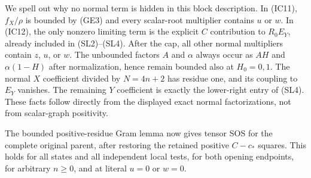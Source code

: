We spell out why no normal term is hidden in this block description.
In (IC11), $f_X/\rho$ is bounded by (GE3) and every scalar-root
multiplier contains $u$ or $w$. In (IC12), the only nonzero limiting
term is the explicit $C$ contribution to $R_0E_Y$, already included
in (SL2)--(SL4). After the cap, all other normal multipliers contain
$z$, $u$, or $w$. The unbounded factors $A$ and $\alpha$ always occur
as $AH$ and $\alpha(1-H)$ after normalization, hence remain bounded
also at $H_0=0,1$. The normal $X$ coefficient divided by $N=4n+2$
has residue one, and its coupling to $E_Y$ vanishes. The remaining
$Y$ coefficient is exactly the lower-right entry of (SL4).
These facts follow directly from the displayed exact normal
factorizations, not from scalar-graph positivity.

The bounded positive-residue Gram lemma now gives tensor SOS for the
complete original parent, after restoring the retained positive
$C-c_*$ squares. This holds for all states and all independent local
tests, for both opening endpoints, for arbitrary $n\ge0$, and at
literal $u=0$ or $w=0$.
